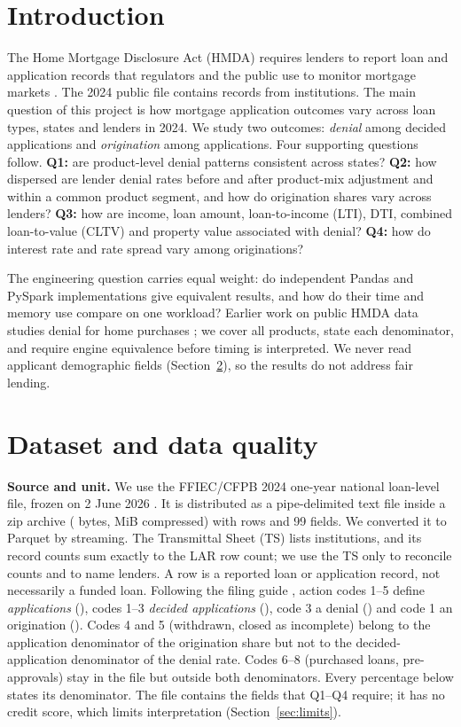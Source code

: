 \documentclass[acmtog,nonacm]{acmart}
\begin{document}
\section{Introduction}
The Home Mortgage Disclosure Act (HMDA) requires lenders to report loan and application records that regulators and the public use to monitor mortgage markets \cite{regc}. The 2024 public file contains \NRecords{} records from \LendersTotal{} institutions. The main question of this project is how mortgage application outcomes vary across loan types, states and lenders in 2024. We study two outcomes: \emph{denial} among decided applications and \emph{origination} among applications. Four supporting questions follow. \textbf{Q1:} are product-level denial patterns consistent across states? \textbf{Q2:} how dispersed are lender denial rates before and after product-mix adjustment and within a common product segment, and how do origination shares vary across lenders? \textbf{Q3:} how are income, loan amount, loan-to-income (LTI), DTI, combined loan-to-value (CLTV) and property value associated with denial? \textbf{Q4:} how do interest rate and rate spread vary among originations?

The engineering question carries equal weight: do independent Pandas and PySpark implementations give equivalent results, and how do their time and memory use compare on one workload? Earlier work on public HMDA data studies denial for home purchases \cite{garcia2026}; we cover all products, state each denominator, and require engine equivalence before timing is interpreted. We never read applicant demographic fields (Section~\ref{sec:data}), so the results do not address fair lending.

\section{Dataset and data quality}\label{sec:data}
\textbf{Source and unit.} We use the FFIEC/CFPB 2024 one-year national loan-level file, frozen on 2 June 2026 \cite{ffiecdata}. It is distributed as a pipe-delimited text file inside a zip archive (\SourceBytes{} bytes, \SourceMiB{} MiB compressed) with \NRecords{} rows and 99 fields. We converted it to Parquet by streaming. The Transmittal Sheet (TS) lists \LendersTotal{} institutions, and its record counts sum exactly to the LAR row count; we use the TS only to reconcile counts and to name lenders. A row is a reported loan or application record, not necessarily a funded loan. Following the filing guide \cite{fig2024}, action codes 1--5 define \emph{applications} (\NApps{}), codes 1--3 \emph{decided applications} (\NDecided{}), code 3 a denial (\NDenied{}) and code 1 an origination (\NOrig{}). Codes 4 and 5 (withdrawn, closed as incomplete) belong to the application denominator of the origination share but not to the decided-application denominator of the denial rate. Codes 6--8 (purchased loans, pre-approvals) stay in the file but outside both denominators. Every percentage below states its denominator. The file contains the fields that Q1--Q4 require; it has no credit score, which limits interpretation (Section~\ref{sec:limits}).
\end{document}
